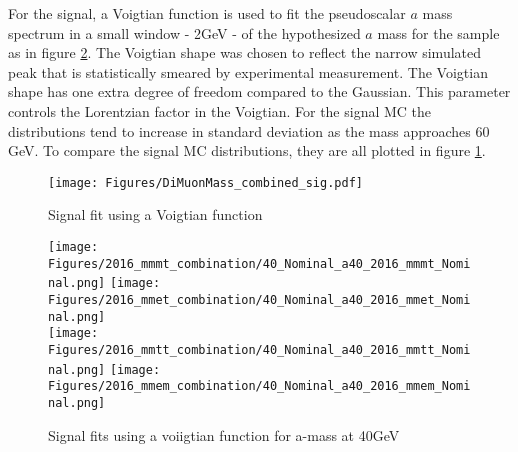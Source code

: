 For the signal, a Voigtian function is used to fit the pseudoscalar $a$ mass spectrum in a small window - 2GeV - of the hypothesized $a$ mass for the sample as in figure \ref{fig:fit_sig}. The Voigtian shape was chosen to reflect the narrow simulated peak that is statistically smeared by experimental measurement. The Voigtian shape has one extra degree of freedom compared to the Gaussian. This parameter controls the Lorentzian factor in the Voigtian. For the signal MC the distributions tend to increase in standard deviation as the mass approaches 60 GeV. To compare the signal MC distributions, they are all plotted in figure \ref{fig:fit_sig_all}.


\begin{figure}[ht!b]
    \centering 
    \texttt{[image: Figures/DiMuonMass\_combined\_sig.pdf]}
    \caption{\label{fig:fit_sig_all} Signal fit using a Voigtian function}
\end{figure}
\begin{figure}[ht!b]
  \centering
  \texttt{[image: Figures/2016\_mmmt\_combination/40\_Nominal\_a40\_2016\_mmmt\_Nominal.png]}
  \texttt{[image: Figures/2016\_mmet\_combination/40\_Nominal\_a40\_2016\_mmet\_Nominal.png]}\\
  \texttt{[image: Figures/2016\_mmtt\_combination/40\_Nominal\_a40\_2016\_mmtt\_Nominal.png]}
  \texttt{[image: Figures/2016\_mmem\_combination/40\_Nominal\_a40\_2016\_mmem\_Nominal.png]}\\
    \caption{\label{fig:fit_sig} Signal fits using a voiigtian function for a-mass at 40GeV }
\end{figure}

